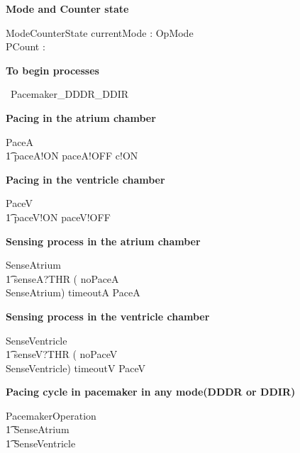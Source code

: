 \textbf{Mode and Counter state}

\begin{schema}{ModeCounterState}
  currentMode : OpMode\\
  PCount : \nat \\
\end{schema}


\hline
\textbf{To begin \Circus processes }
\hline


\begin{circus}
	\circprocess\ Pacemaker\_DDDR\_DDIR \circdef \circbegin
\end{circus}



\textbf {Pacing in the atrium chamber}

\begin{circusaction}
  PaceA \circdef \\
  \t1 paceA!ON \then paceA!OFF \then  c!ON \then  \Skip 
\end{circusaction}


\textbf {Pacing in the ventricle chamber}

\begin{circusaction}
  PaceV \circdef \\
  \t1 paceV!ON \then paceV!OFF \then \Skip
\end{circusaction}

\textbf {Sensing process in the atrium chamber}



\begin{circusaction}
SenseAtrium \circdef \\ 
\t1 senseA?THR \then 
    ( noPaceA \then \Skip \\
      \extchoice SenseAtrium) \extchoice timeoutA \then  PaceA 
\end{circusaction}




\textbf {Sensing process in the ventricle chamber}



\begin{circusaction}
SenseVentricle \circdef \\
\t1 senseV?THR \then 
   ( noPaceV \then \Skip \\
   \extchoice SenseVentricle) \extchoice timeoutV \then PaceV
\end{circusaction}




\textbf {Pacing cycle in pacemaker in any mode(DDDR or DDIR)}
\begin{circusaction}
PacemakerOperation \circdef\\
  \t1 SenseAtrium \circseq \\
  \t1 SenseVentricle
\end{circusaction}

